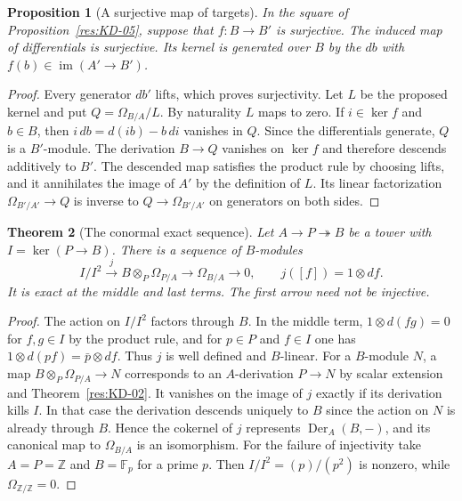 \documentclass[11pt,oneside,openany]{book}
\newtheorem{theorem}{Theorem}[chapter]
\newtheorem{proposition}[theorem]{Proposition}
\theoremstyle{definition}
\theoremstyle{remark}
\begin{document}
\begin{proposition}[A surjective map of targets]\label{res:KD-10}
In the square of Proposition~\ref{res:KD-05}, suppose that $f:B\to B'$ is surjective. The induced map of differentials is surjective. Its kernel is generated over $B$ by the $db$ with $f(b)\in\operatorname{im}(A'\to B')$.
\end{proposition}

\begin{proof}
Every generator $db'$ lifts, which proves surjectivity. Let $L$ be the proposed kernel and put $Q=\Omega_{B/A}/L$. By naturality $L$ maps to zero. If $i\in\ker f$ and $b\in B$, then $i\,db=d(ib)-b\,di$ vanishes in $Q$. Since the differentials generate, $Q$ is a $B'$-module. The derivation $B\to Q$ vanishes on $\ker f$ and therefore descends additively to $B'$. The descended map satisfies the product rule by choosing lifts, and it annihilates the image of $A'$ by the definition of $L$. Its linear factorization $\Omega_{B'/A'}\to Q$ is inverse to $Q\to\Omega_{B'/A'}$ on generators on both sides.
\end{proof}

\begin{theorem}[The conormal exact sequence]\label{res:KD-11}
Let $A\to P\twoheadrightarrow B$ be a tower with $I=\ker(P\to B)$. There is a sequence of $B$-modules
\[
 I/I^2\xrightarrow{\ j\ } B\otimes_P\Omega_{P/A}
 \longrightarrow\Omega_{B/A}\longrightarrow0,\qquad
 j([f])=1\otimes df .
\]
It is exact at the middle and last terms. The first arrow need not be injective.
\end{theorem}

\begin{proof}
The action on $I/I^2$ factors through $B$. In the middle term, $1\otimes d(fg)=0$ for $f,g\in I$ by the product rule, and for $p\in P$ and $f\in I$ one has $1\otimes d(pf)=\bar p\otimes df$. Thus $j$ is well defined and $B$-linear. For a $B$-module $N$, a map $B\otimes_P\Omega_{P/A}\to N$ corresponds to an $A$-derivation $P\to N$ by scalar extension and Theorem~\ref{res:KD-02}. It vanishes on the image of $j$ exactly if its derivation kills $I$. In that case the derivation descends uniquely to $B$ since the action on $N$ is already through $B$. Hence the cokernel of $j$ represents $\operatorname{Der}_A(B,-)$, and its canonical map to $\Omega_{B/A}$ is an isomorphism. For the failure of injectivity take $A=P=\mathbb Z$ and $B=\mathbb F_p$ for a prime $p$. Then $I/I^2=(p)/(p^2)$ is nonzero, while $\Omega_{\mathbb Z/\mathbb Z}=0$.
\end{proof}
\end{document}
